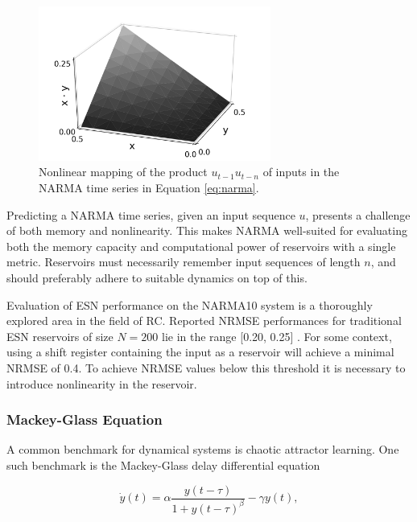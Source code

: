 \begin{figure}[t!]
  \centering
  \includegraphics[width=3.0in]{figures/NARMA-nonlinearity.png}
  \caption{
    Nonlinear mapping of the product $u_{t-1}u_{t-n}$ of inputs in the NARMA
time series in Equation \protect\ref{eq:narma}.
  }
  \label{fig:narma-nonlinearity}
\end{figure}

Predicting a NARMA time series, given an input sequence $u$, presents a
challenge of both memory and nonlinearity. This makes NARMA well-suited for
evaluating both the memory capacity and computational power of reservoirs with a
single metric. Reservoirs must necessarily remember input sequences of length
$n$, and should preferably adhere to suitable dynamics on top of this.

Evaluation of ESN performance on the NARMA10 system is a thoroughly explored
area in the field of RC. Reported NRMSE performances for traditional ESN
reservoirs of size $N = 200$ lie in the range [0.20, 0.25]
\cite{verstraeten_experimental_2007, rodan_minimum_2011,
goudarzi_comparative_2014, jaeger_adaptive_2003}. For some context, using a
shift register containing the input as a reservoir will achieve a minimal NRMSE
of 0.4. To achieve NRMSE values below this threshold it is necessary to
introduce nonlinearity in the reservoir.

\subsubsection{Mackey-Glass Equation}

A common benchmark for dynamical systems is chaotic attractor learning. One such
benchmark is the Mackey-Glass delay differential equation

\begin{equation}
  \dot{y}(t) =
    \alpha \frac
    {y(t-\tau)}
    {1 + y(t-\tau)^\beta}
    - \gamma y(t),
  \label{eq:mg17}
\end{equation}

